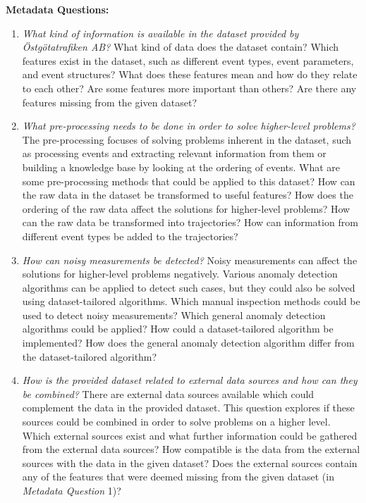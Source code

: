 \begin{description}
  \item \textbf{Metadata Questions:}
  \begin{enumerate}
    \item \textit{What kind of information is available in the dataset provided by Östgötatrafiken AB?} \newline
    What kind of data does the dataset contain?
    Which features exist in the dataset, such as different event types, event parameters, and event structures?
    What does these features mean and how do they relate to each other?
    Are some features more important than others?
    Are there any features missing from the given dataset?
    \item \textit{What pre-processing needs to be done in order to solve higher-level problems?} \newline
    The pre-processing focuses of solving problems inherent in the dataset, such as processing events and extracting relevant information from them or building a knowledge base by looking at the ordering of events.
    What are some pre-processing methods that could be applied to this dataset?
    How can the raw data in the dataset be transformed to useful features?
    How does the ordering of the raw data affect the solutions for higher-level problems?
    How can the raw data be transformed into trajectories?
    How can information from different event types be added to the trajectories?
    \item \textit{How can noisy measurements be detected?} \newline
    Noisy measurements can affect the solutions for higher-level problems negatively.
    Various anomaly detection algorithms can be applied to detect such cases, but they could also be solved using dataset-tailored algorithms.
    Which manual inspection methods could be used to detect noisy measurements?
    Which general anomaly detection algorithms could be applied?
    How could a dataset-tailored algorithm be implemented?
    How does the general anomaly detection algorithm differ from the dataset-tailored algorithm?
    \item \textit{How is the provided dataset related to external data sources and how can they be combined?} \newline
    There are external data sources available which could complement the data in the provided dataset.
    This question explores if these sources could be combined in order to solve problems on a higher level.
    Which external sources exist and what further information could be gathered from the external data sources?
    How compatible is the data from the external sources with the data in the given dataset?
    Does the external sources contain any of the features that were deemed missing from the given dataset (in \textit{Metadata Question} 1)? 
  \end{enumerate}


\end{description}

